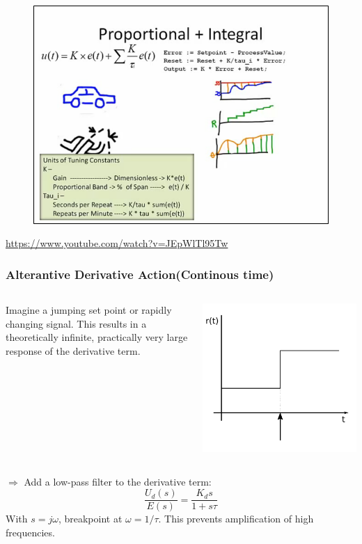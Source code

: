 \begin{frame}
	\begin{figure}
\centering
\includegraphics[width=0.7\linewidth]{img/PID_video}
\end{figure}
	\url{https://www.youtube.com/watch?v=JEpWlTl95Tw}
\end{frame}

\begin{frame}
	\frametitle{Alterantive Derivative Action(Continous time)}
		\begin{columns}
			\begin{column}{0.7\linewidth}
				Imagine a jumping set point or rapidly changing signal. 
				This results in a theoretically infinite, practically very large response of
				the derivative term.  
			\end{column}
			\begin{column}{0.3\linewidth}
				\includegraphics[width=\linewidth]{img/piecewise-setpoint}
			\end{column}
		\end{columns}
		$\Rightarrow$ Add a low-pass filter to the derivative term:
		\begin{equation*}
			\frac{U_d(s)}{E(s)} = \frac{K_d s}{1+s\tau}
		\end{equation*}
		With $s=j\omega$, breakpoint at $\omega=1/\tau$. This prevents amplification of high frequencies. 
\end{frame}

